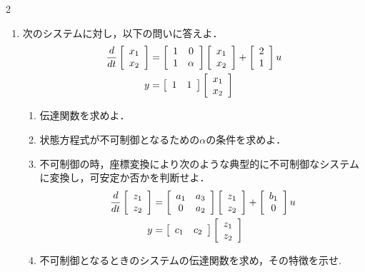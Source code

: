 \begin{multicols}{2}
\begin{enumerate}
\begin{enumerate}
\item
オブザーバの極（推定誤差の収束速さ）が$-1$, $-2$となるようにオブザーバゲイン$K$を求めよ．
\vspace{5.5cm}

\end{enumerate}


\item
次のシステムに対し，以下の問いに答えよ．
\begin{align*}
	\frac{d}{dt}\bmatrix{c} x_1 \\ x_2 \ematrix &= \bmatrix{cc} 1 & 0 \\ 1 & \alpha\ematrix \bmatrix{c} x_1 \\ x_2 \ematrix+  \bmatrix{c} 2 \\ 1 \ematrix u\\
	y &= \bmatrix{cc} 1 & 1 \ematrix \bmatrix{c} x_1 \\ x_2 \ematrix
\end{align*}
\begin{enumerate}
\item 伝達関数を求めよ．
\vspace{4cm}
\item 状態方程式が不可制御となるための$\alpha$の条件を求めよ．
\vspace{7cm}

\item
不可制御の時，座標変換により次のような典型的に不可制御なシステムに変換し，可安定か否かを判断せよ．
\begin{align*}
	\frac{d}{dt}\bmatrix{c} z_1 \\ z_2 \ematrix &= \bmatrix{cc} a_1 & a_3 \\ 0 & a_2 \ematrix \bmatrix{c} z_1 \\ z_2 \ematrix+  \bmatrix{c}  b_1 \\ 0 \ematrix u\\
	y &= \bmatrix{cc} c_1 & c_2\ematrix \bmatrix{c} z_1 \\ z_2 \ematrix
\end{align*}
\vspace{7cm}


\item
不可制御となるときのシステムの伝達関数を求め，その特徴を示せ.
\vspace{5cm}
\end{enumerate}

\end{enumerate}
\end{multicols}



